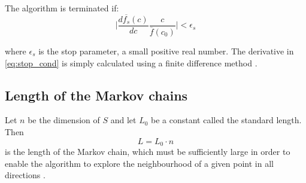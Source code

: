 The algorithm is terminated if:
\begin{equation}
\label{eq:stop_cond}
    \Bigg|\frac{d \overline{f_s}(c)}{dc} \frac{c}{\overline{f}(c_0)} \Bigg| < \epsilon_s 
\end{equation}

where $\epsilon_s$ is the stop parameter, a small positive real number. The derivative in \cref{eq:stop_cond}
is simply calculated using a finite difference method \cite{dekkers}.
 

\subsection{Length of the Markov chains}
Let $n$ be the dimension of $S$ and let $L_0$ be a constant called the standard length. Then 
\begin{equation}
    L=L_0 \cdot n     
\end{equation}
is the length of the Markov chain, which must be sufficiently large in order to enable the algorithm to explore 
the neighbourhood of a given point in all directions \cite{dekkers}. \vspace{5pt}





